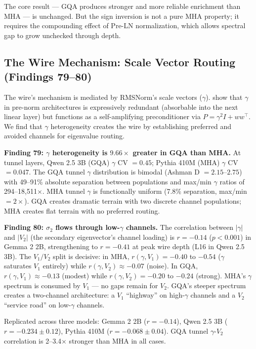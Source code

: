 \documentclass[12pt]{article}
\begin{document}
The core result --- GQA produces stronger and more reliable enrichment than MHA --- is unchanged. But the sign inversion is not a pure MHA property; it requires the compounding effect of Pre-LN normalization, which allows spectral gap to grow unchecked through depth.

\subsection{The Wire Mechanism: Scale Vector Routing (Findings 79--80)}

The wire's mechanism is mediated by RMSNorm's scale vectors ($\gamma$). \citet{wang2026b} show that $\gamma$ in pre-norm architectures is expressively redundant (absorbable into the next linear layer) but functions as a self-amplifying preconditioner via $P = \gamma^2 I + ww^\top$. We find that $\gamma$ heterogeneity creates the wire by establishing preferred and avoided channels for eigenvalue routing.

\textbf{Finding 79: $\gamma$ heterogeneity is $9.66\times$ greater in GQA than MHA.} At tunnel layers, Qwen 2.5 3B (GQA) $\gamma$ CV $= 0.45$; Pythia 410M (MHA) $\gamma$ CV $= 0.047$. The GQA tunnel $\gamma$ distribution is bimodal (Ashman D $= 2.15$--$2.75$) with 49--91\% absolute separation between populations and max/min $\gamma$ ratios of 294--18,511$\times$. MHA tunnel $\gamma$ is functionally uniform (7.8\% separation, max/min $= 2\times$). GQA creates dramatic terrain with two discrete channel populations; MHA creates flat terrain with no preferred routing.

\textbf{Finding 80: $\sigma_2$ flows through low-$\gamma$ channels.} The correlation between $|\gamma|$ and $|V_2|$ (the secondary eigenvector's channel loading) is $r = -0.14$ ($p < 0.001$) in Gemma 2 2B, strengthening to $r = -0.41$ at peak wire depth (L16 in Qwen 2.5 3B). The $V_1/V_2$ split is decisive: in MHA, $r(\gamma,V_1) = -0.40$ to $-0.54$ ($\gamma$ saturates $V_1$ entirely) while $r(\gamma,V_2) \approx -0.07$ (noise). In GQA, $r(\gamma,V_1) \approx -0.13$ (modest) while $r(\gamma,V_2) = -0.20$ to $-0.24$ (strong). MHA's $\gamma$ spectrum is consumed by $V_1$ --- no gaps remain for $V_2$. GQA's steeper spectrum creates a two-channel architecture: a $V_1$ ``highway'' on high-$\gamma$ channels and a $V_2$ ``service road'' on low-$\gamma$ channels.

Replicated across three models: Gemma 2 2B ($r = -0.14$), Qwen 2.5 3B ($r = -0.234 \pm 0.12$), Pythia 410M ($r = -0.068 \pm 0.04$). GQA tunnel $\gamma$-$V_2$ correlation is 2--3.4$\times$ stronger than MHA in all cases.
\end{document}
